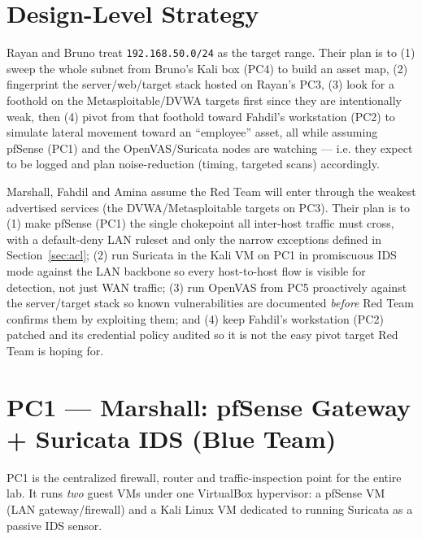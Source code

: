 \documentclass[11pt,a4paper]{article}
\begin{document}
\section{Design-Level Strategy}

\begin{redbox}
Rayan and Bruno treat \texttt{192.168.50.0/24} as the target range. Their plan is to
(1) sweep the whole subnet from Bruno's Kali box (PC4) to build an asset map, (2)
fingerprint the server/web/target stack hosted on Rayan's PC3, (3) look for a foothold
on the Metasploitable/DVWA targets first since they are intentionally weak, then (4)
pivot from that foothold toward Fahdil's workstation (PC2) to simulate lateral movement
toward an ``employee'' asset, all while assuming pfSense (PC1) and the OpenVAS/Suricata
nodes are watching --- i.e. they expect to be logged and plan noise-reduction (timing,
targeted scans) accordingly.
\end{redbox}

\begin{bluebox}
Marshall, Fahdil and Amina assume the Red Team will enter through the weakest
advertised services (the DVWA/Metasploitable targets on PC3). Their plan is to (1) make
pfSense (PC1) the single chokepoint all inter-host traffic must cross, with a
default-deny LAN ruleset and only the narrow exceptions defined in
Section~\ref{sec:acl}; (2) run Suricata in the Kali VM on PC1 in promiscuous IDS mode
against the LAN backbone so every host-to-host flow is visible for detection, not just
WAN traffic; (3) run OpenVAS from PC5 proactively against the server/target stack so
known vulnerabilities are documented \emph{before} Red Team confirms them by exploiting
them; and (4) keep Fahdil's workstation (PC2) patched and its credential policy audited
so it is not the easy pivot target Red Team is hoping for.
\end{bluebox}

\clearpage

\section{PC1 --- Marshall: pfSense Gateway + Suricata IDS (Blue Team)}
\label{sec:pc1}

PC1 is the centralized firewall, router and traffic-inspection point for the entire
lab. It runs \emph{two} guest VMs under one VirtualBox hypervisor: a pfSense VM (LAN
gateway/firewall) and a Kali Linux VM dedicated to running Suricata as a passive IDS
sensor.
\end{document}
